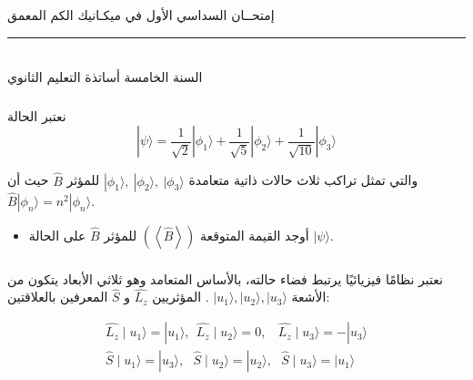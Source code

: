 \documentclass[a4paper,14pt]{article}
\begin{document}
	
\begin{center}
	{\Large\sffamily إمتحــان السداسي الأول في ميكـانيك الكم المعمق }
\end{center}
\rule{\textwidth}{1pt}\\
{\sffamily السنة الخامسة أساتذة التعليم الثانوي}\hspace*{\fill}{\sffamily $ 2024/01/15 $}
	
\subsubsection*{}		
		
نعتبر الحالة 
\begin{equation*}
	|\psi\rangle= \dfrac{1}{\sqrt{2}}|\phi_{1}\rangle + \dfrac{1}{\sqrt{5}}|\phi_{2}\rangle + \dfrac{1}{\sqrt{10}}|\phi_{3}\rangle
\end{equation*}	

والتي تمثل تراكب ثلاث حالات ذاتية متعامدة	
$|\phi_{1}\rangle,~|\phi_{2}\rangle,~	|\phi_{3}\rangle $ 
للمؤثر $\hat{B}$ حيث أن $\hat{B}|\phi_{n}\rangle = n^{2}|\phi_{n}\rangle$.

\begin{itemize}
	\item 
أوجد القيمة المتوقعة $(\left\langle\hat{B}\right\rangle)$ للمؤثر $\hat{B}$ على الحالة $|\psi\rangle$.
\end{itemize}

\subsubsection*{}
	
نعتبر نظامًا فيزيائيًا يرتبط فضاء حالته، بالأساس المتعامد وهو ثلاثي الأبعاد يتكون من الأشعة $|u_{1}\rangle, 	|u_{2}\rangle, 	|u_{3}\rangle $ . المؤثريين $\hat{L_{z}}$ و $\hat{S}$ المعرفين بالعلاقتين:

\begin{equation*}
	\label{eqn:1}
	\begin{array}{ccl}
		\hat{L_{z}}\mid u_{1}\rangle = |u_{1}\rangle,~~ \hat{L_{z}}\mid u_{2}\rangle= 0,~~~~ \hat{L_{z}}\mid u_{3}\rangle=-|u_{3}\rangle\\
		
		\hat{S} \mid u_{1}\rangle = |u_{3}\rangle,~~~ \hat{S}\mid u_{2}\rangle=|u_{2}\rangle , ~~~\hat{S}\mid u_{3}\rangle=|u_{1}\rangle
	\end{array}
\end{equation*} 
 
\end{document}
